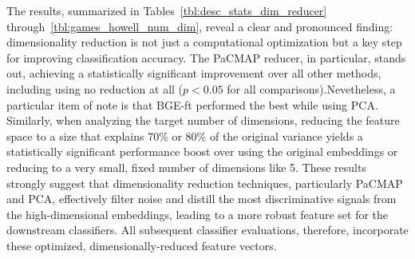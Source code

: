 The results, summarized in Tables~\ref{tbl:desc_stats_dim_reducer} through~\ref{tbl:games_howell_num_dim}, reveal a clear and pronounced finding: dimensionality reduction is not just a computational optimization but a key step for improving classification accuracy. The PaCMAP reducer, in particular, stands out, achieving a statistically significant improvement over all other methods, including using no reduction at all (\(p<0.05\) for all comparisons).Nevetheless, a particular item of note is that BGE-ft performed the best while using PCA.  Similarly, when analyzing the target number of dimensions, reducing the feature space to a size that explains 70\% or 80\% of the original variance yields a statistically significant performance boost over using the original embeddings or reducing to a very small, fixed number of dimensions like 5. These results strongly suggest that dimensionality reduction techniques, particularly PaCMAP and PCA, effectively filter noise and distill the most discriminative signals from the high-dimensional embeddings, leading to a more robust feature set for the downstream classifiers. All subsequent classifier evaluations, therefore, incorporate these optimized, dimensionally-reduced feature vectors.

\begin{table}[!ht]
    \captionsetup{skip=5pt}
\centering
\caption{Descriptive Statistics for F1-Scores by Dimensionality Reducer (Test Data)}
\label{tbl:desc_stats_dim_reducer}
\end{table}

